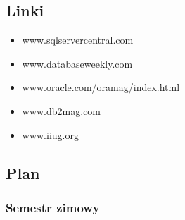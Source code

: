 \documentclass[12pt]{article}
\begin{document}
\subsection{Linki}
\begin{itemize}
\item www.sqlservercentral.com
\item www.databaseweekly.com
\item www.oracle.com/oramag/index.html
\item www.db2mag.com
\item www.iiug.org
\end{itemize}

\subsection{Plan}
\subsubsection{Semestr zimowy}
\end{document}
